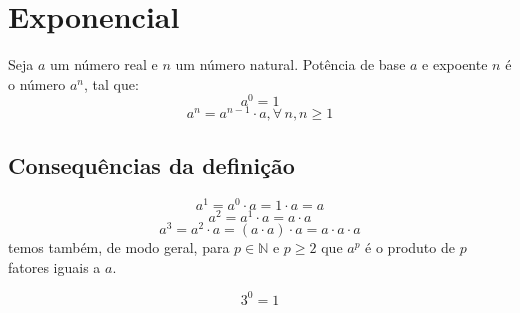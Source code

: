 \chapter{Exponencial}
\begin{df}
Seja $a$ um número real e $n$ um número natural. Potência de base $a$ e expoente $n$ é o número $a^n$, tal que:\[a^0 = 1\]
\[a^n = a^{n-1}\cdot a \textrm{,} \,\forall \, n\textrm{,} \,n \geqslant 1\]
\section{Consequências da definição}
\[a^1 = a^0 \cdot a = 1 \cdot a = a\]
\[a^2 = a^1 \cdot a = a \cdot a\]
\[a^3 = a^2 \cdot a = (a \cdot a) \cdot a = a \cdot a \cdot a\]
temos também, de modo geral, para $p \in \mathbb{N} \textrm{ e } p \geq 2$ que $a^p$ é o produto de $p$ fatores iguais a $a$.
\begin{exemplo}
\[3^0 = 1\]

\end{exemplo}
\end{df}
